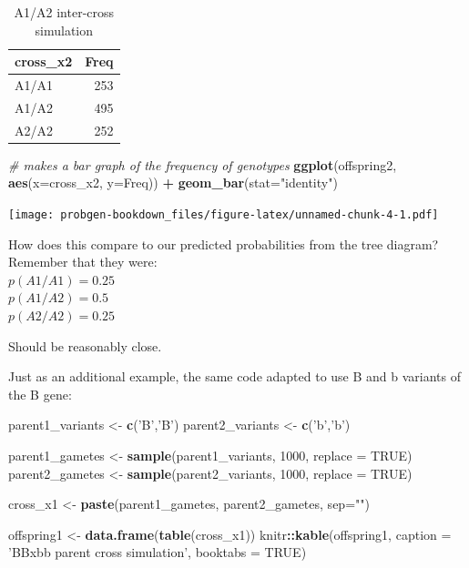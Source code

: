 \documentclass[]{book}
\newenvironment{Shaded}{\begin{snugshade}}{\end{snugshade}}
\newcommand{\KeywordTok}[1]{\textcolor[rgb]{0.13,0.29,0.53}{\textbf{#1}}}
\newcommand{\DataTypeTok}[1]{\textcolor[rgb]{0.13,0.29,0.53}{#1}}
\newcommand{\DecValTok}[1]{\textcolor[rgb]{0.00,0.00,0.81}{#1}}
\newcommand{\StringTok}[1]{\textcolor[rgb]{0.31,0.60,0.02}{#1}}
\newcommand{\CommentTok}[1]{\textcolor[rgb]{0.56,0.35,0.01}{\textit{#1}}}
\newcommand{\OtherTok}[1]{\textcolor[rgb]{0.56,0.35,0.01}{#1}}
\newcommand{\OperatorTok}[1]{\textcolor[rgb]{0.81,0.36,0.00}{\textbf{#1}}}
\newcommand{\NormalTok}[1]{#1}
\theoremstyle{definition}
\theoremstyle{definition}
\theoremstyle{definition}
\theoremstyle{remark}
\begin{document}
\begin{table}

\caption{\label{tab:unnamed-chunk-4}A1/A2 inter-cross simulation}
\centering
\begin{tabular}[t]{lr}
\toprule
cross\_x2 & Freq\\
\midrule
A1/A1 & 253\\
A1/A2 & 495\\
A2/A2 & 252\\
\bottomrule
\end{tabular}
\end{table}

\begin{Shaded}
\begin{Highlighting}[]
\CommentTok{# makes a bar graph of the frequency of genotypes}
\KeywordTok{ggplot}\NormalTok{(offspring2, }\KeywordTok{aes}\NormalTok{(}\DataTypeTok{x=}\NormalTok{cross_x2, }\DataTypeTok{y=}\NormalTok{Freq)) }\OperatorTok{+}\StringTok{ }\KeywordTok{geom_bar}\NormalTok{(}\DataTypeTok{stat=}\StringTok{"identity"}\NormalTok{)}
\end{Highlighting}
\end{Shaded}

\texttt{[image: probgen-bookdown\_files/figure-latex/unnamed-chunk-4-1.pdf]}

How does this compare to our predicted probabilities from the tree
diagram?\\
Remember that they were:\\
\(p(A1/A1) = 0.25\)\\
\(p(A1/A2) = 0.5\)\\
\(p(A2/A2) = 0.25\)

Should be reasonably close.

Just as an additional example, the same code adapted to use B and b
variants of the B gene:

\begin{Shaded}
\begin{Highlighting}[]
\NormalTok{parent1_variants <-}\StringTok{ }\KeywordTok{c}\NormalTok{(}\StringTok{'B'}\NormalTok{,}\StringTok{'B'}\NormalTok{)}
\NormalTok{parent2_variants <-}\StringTok{ }\KeywordTok{c}\NormalTok{(}\StringTok{'b'}\NormalTok{,}\StringTok{'b'}\NormalTok{)}

\NormalTok{parent1_gametes <-}\StringTok{ }\KeywordTok{sample}\NormalTok{(parent1_variants, }\DecValTok{1000}\NormalTok{, }\DataTypeTok{replace =} \OtherTok{TRUE}\NormalTok{)}
\NormalTok{parent2_gametes <-}\StringTok{ }\KeywordTok{sample}\NormalTok{(parent2_variants, }\DecValTok{1000}\NormalTok{, }\DataTypeTok{replace =} \OtherTok{TRUE}\NormalTok{)}

\NormalTok{cross_x1 <-}\StringTok{ }\KeywordTok{paste}\NormalTok{(parent1_gametes, parent2_gametes, }\DataTypeTok{sep=}\StringTok{""}\NormalTok{)}

\NormalTok{offspring1 <-}\StringTok{ }\KeywordTok{data.frame}\NormalTok{(}\KeywordTok{table}\NormalTok{(cross_x1))}
\NormalTok{knitr}\OperatorTok{::}\KeywordTok{kable}\NormalTok{(offspring1, }\DataTypeTok{caption =} \StringTok{'BBxbb parent cross simulation'}\NormalTok{, }\DataTypeTok{booktabs =} \OtherTok{TRUE}\NormalTok{)}
\end{Highlighting}
\end{Shaded}
\end{document}
